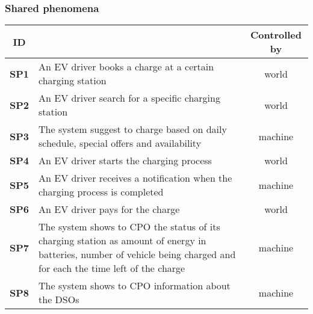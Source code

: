 \subsubsection*{Shared phenomena}
\begin{table}[H]
    \centering
    \begin{tabularx}{\textwidth}{c|X|c}
        \toprule
        ID            &                                                                                                                                                                       & Controlled by \\ \midrule
        \textbf{SP1}  & An EV driver books a charge at a certain charging station                                                                                                             & world         \\ \midrule
        \textbf{SP2}  & An EV driver search for a specific charging station                                                                                                                   & world         \\ \midrule
        \textbf{SP3}  & The system suggest to charge based on daily schedule, special offers and availability                                                                                 & machine       \\ \midrule
        \textbf{SP4}  & An EV driver starts the charging process                                                                                                                              & world         \\ \midrule
        \textbf{SP5}  & An EV driver receives a notification when the charging process is completed                                                                                           & machine       \\ \midrule
        \textbf{SP6}  & An EV driver pays for the charge                                                                                                                                      & world         \\ \midrule
        \textbf{SP7}  & The system shows to CPO the status of its charging station as amount of energy in batteries, number of vehicle being charged and for each the time left of the charge & machine       \\ \midrule
        \textbf{SP8}  & The system shows to CPO information about the DSOs                                                                                                                    & machine       \\ \midrule

\end{tabularx}
\end{table}
